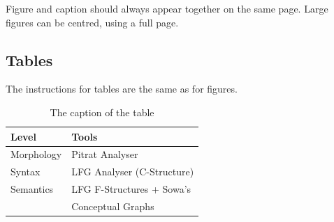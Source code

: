 \documentclass{article}
\begin{document}
Figure and caption should always appear together on the same page. Large figures
can be centred, using a full page.

\subsection{Tables}

The instructions for tables are the same as for figures.
%
\begin{table}[!h]
\begin{center}
\begin{tabularx}{\columnwidth}{|l|X|}

      \hline
      Level&Tools\\
      \hline
      Morphology & Pitrat Analyser\\
      \hline
      Syntax & LFG Analyser (C-Structure)\\
      \hline
     Semantics & LFG F-Structures + Sowa's\\
     & Conceptual Graphs\\
      \hline

\end{tabularx}
\caption{The caption of the table}
 \end{center}
\end{table}

%
%
%
%
%
\end{document}
